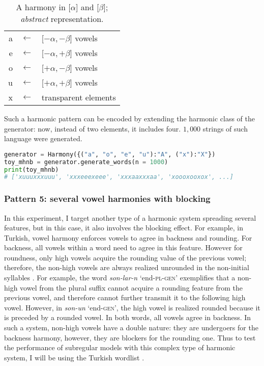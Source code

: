 \begin{table}[h!]
\begin{center}
\begin{tabular}{rcl}
a & $\leftarrow$ & {[}$-\alpha, -\beta${]} vowels \\
e & $\leftarrow$ & {[}$-\alpha, +\beta${]} vowels \\
o & $\leftarrow$ & {[}$+\alpha, -\beta${]} vowels \\
u & $\leftarrow$ & {[}$+\alpha, +\beta${]} vowels \\
x & $\leftarrow$ & transparent elements
\end{tabular}
\end{center}
\caption{A harmony in {[}$\alpha${]} and {[}$\beta${]}; \emph{abstract} representation.}
\label{mhnbmap}
\end{table}

Such a harmonic pattern can be encoded by extending the harmonic class of the generator: now, instead of two elements, it includes four.
$1,000$ strings of such language were generated.

\begin{lstlisting}[language=Python]
generator = Harmony({("a", "o", "e", "u"):"A", ("x"):"X"})
toy_mhnb = generator.generate_words(n = 1000)
print(toy_mhnb)
# ['xuuuxxxuuu', 'xxxeeexeee', 'xxxaaxxxaa', 'xoooxooxox', ...]
\end{lstlisting}

\subsubsection{Pattern 5: several vowel harmonies with blocking}

In this experiment, I target another type of a harmonic system spreading several features, but in this case, it also involves the blocking effect.
For example, in Turkish, vowel harmony enforces vowels to agree in backness and rounding.
For backness, all vowels within a word need to agree in this feature.
However for roundness, only high vowels acquire the rounding value of the previous vowel; therefore, the non-high vowels are always realized unrounded in the non-initial syllables \citep{Levi2001,Kramer2003}.
For example, the word \emph{son-lar-\textturnm n} `end-\textsc{pl-gen}' exemplifies that a non-high vowel from the plural suffix cannot acquire a rounding feature from the previous vowel, and therefore cannot further transmit it to the following high vowel.
However, in \emph{son-un} `end-\textsc{gen}', the high vowel is realized rounded because it is preceded by a rounded vowel.
In both words, all vowels agree in backness.
In such a system, non-high vowels have a double nature: they are undergoers for the backness harmony, however, they are blockers for the rounding one.
Thus to test the performance of subregular models with this complex type of harmonic system, I will be using the Turkish wordlist \href{http://www.swarthmore.edu/SocSci/harmony/public_html/dummyresults.html}{\faChain} \citep{HarrisonEtAl2004}.

